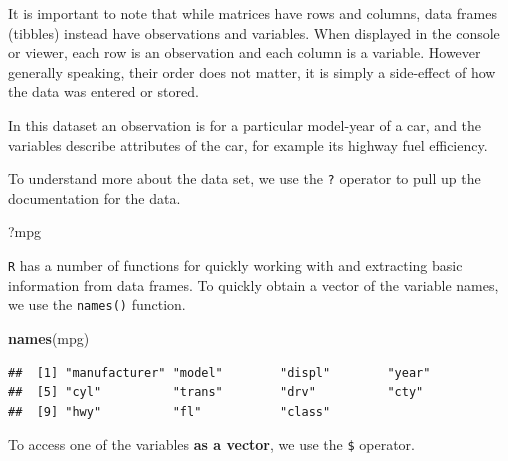\documentclass[]{book}
\newenvironment{Shaded}{\begin{snugshade}}{\end{snugshade}}
\newcommand{\KeywordTok}[1]{\textcolor[rgb]{0.13,0.29,0.53}{\textbf{#1}}}
\newcommand{\OperatorTok}[1]{\textcolor[rgb]{0.81,0.36,0.00}{\textbf{#1}}}
\newcommand{\NormalTok}[1]{#1}
\theoremstyle{definition}
\theoremstyle{definition}
\theoremstyle{definition}
\theoremstyle{remark}
\begin{document}
It is important to note that while matrices have rows and columns, data
frames (tibbles) instead have observations and variables. When displayed
in the console or viewer, each row is an observation and each column is
a variable. However generally speaking, their order does not matter, it
is simply a side-effect of how the data was entered or stored.

In this dataset an observation is for a particular model-year of a car,
and the variables describe attributes of the car, for example its
highway fuel efficiency.

To understand more about the data set, we use the \texttt{?} operator to
pull up the documentation for the data.

\begin{Shaded}
\begin{Highlighting}[]
\NormalTok{?mpg}
\end{Highlighting}
\end{Shaded}

\texttt{R} has a number of functions for quickly working with and
extracting basic information from data frames. To quickly obtain a
vector of the variable names, we use the \texttt{names()} function.

\begin{Shaded}
\begin{Highlighting}[]
\KeywordTok{names}\NormalTok{(mpg)}
\end{Highlighting}
\end{Shaded}

\begin{verbatim}
##  [1] "manufacturer" "model"        "displ"        "year"        
##  [5] "cyl"          "trans"        "drv"          "cty"         
##  [9] "hwy"          "fl"           "class"
\end{verbatim}

To access one of the variables \textbf{as a vector}, we use the
\texttt{\$} operator.

\begin{Shaded}
\end{Shaded}
\end{document}

